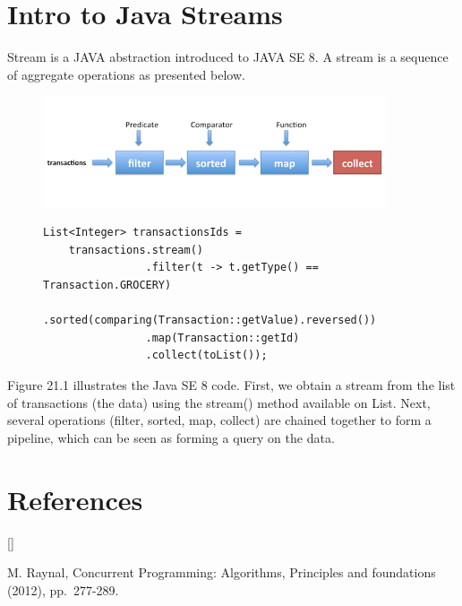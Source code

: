 \documentclass[twoside]{article}
\def\beginrefs{\begin{list}%
        {[\arabic{equation}]}{\usecounter{equation}
         \setlength{\leftmargin}{2.0truecm}\setlength{\labelsep}{0.4truecm}%
         \setlength{\labelwidth}{1.6truecm}}}
\def\endrefs{\end{list}}
\def\bibentry#1{\item[\hbox{[#1]}]}
\begin{document}
\section{Intro to Java Streams}
Stream is a JAVA abstraction introduced to JAVA SE 8. 
A stream is a sequence of aggregate operations as presented below.
\begin{figure}[h]
\caption{}
\centering
\includegraphics[width=0.9\textwidth]{2179048.png}
\begin{lstlisting}
List<Integer> transactionsIds = 
    transactions.stream()
                .filter(t -> t.getType() == Transaction.GROCERY)
                .sorted(comparing(Transaction::getValue).reversed())
                .map(Transaction::getId)
                .collect(toList());
\end{lstlisting}
\end{figure}

Figure 21.1 illustrates the Java SE 8 code. First, we obtain a stream from the list of transactions (the data) using the stream() method available on List. Next, several operations (filter, sorted, map, collect) are chained together to form a pipeline, which can be seen as forming a query on the data.



\section*{References}
\beginrefs

\bibentry{R12}{\sc M. Raynal}, Concurrent Programming: Algorithms, Principles and foundations (2012), 
pp.~277-289.
\endrefs
\end{document}
